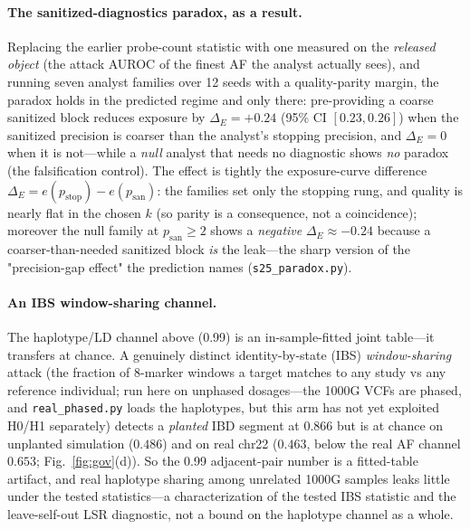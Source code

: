 \documentclass[11pt]{article}
\begin{document}
\paragraph{The sanitized-diagnostics paradox, as a result.} Replacing the
earlier probe-count statistic with one measured on the \emph{released object}
(the attack AUROC of the finest AF the analyst actually sees), and running
seven analyst families over 12 seeds with a quality-parity margin, the paradox
holds in the predicted regime and only there: pre-providing a coarse sanitized
block reduces exposure by $\Delta_E=+0.24$ (95\% CI $[0.23,0.26]$) when the
sanitized precision is coarser than the analyst's stopping precision, and
$\Delta_E=0$ when it is not---while a \emph{null} analyst that needs no
diagnostic shows \emph{no} paradox (the falsification control). The effect is
tightly the exposure-curve difference $\Delta_E=e(p_{\text{stop}})-e(p_{\text{san}})$:
the families set only the stopping rung, and quality is nearly flat in the
chosen $k$ (so parity is a consequence, not a coincidence); moreover the null
family at $p_{\text{san}}\ge2$ shows a \emph{negative} $\Delta_E\approx-0.24$
because a coarser-than-needed sanitized block \emph{is} the leak---the sharp
version of the "precision-gap effect" the prediction names
(\texttt{s25\_paradox.py}).

\paragraph{An IBS window-sharing channel.} The haplotype/LD channel above (0.99) is an
in-sample-fitted joint table---it transfers at chance. A genuinely distinct
identity-by-state (IBS) \emph{window-sharing} attack (the fraction of 8-marker
windows a target matches to any study vs any reference individual; run here on
unphased dosages---the 1000G VCFs are phased, and \texttt{real\_phased.py} loads
the haplotypes, but this arm has not yet exploited H0/H1 separately) detects a
\emph{planted} IBD segment at
$0.866$ but is at chance on unplanted simulation ($0.486$) and on real chr22
($0.463$, below the real AF channel $0.653$; Fig.~\ref{fig:gov}(d)). So the
0.99 adjacent-pair number is a fitted-table artifact, and real haplotype sharing
among unrelated 1000G samples leaks little under the tested statistics---a
characterization of the tested IBS statistic and the leave-self-out LSR
diagnostic, not a bound on the haplotype channel as a whole.
\end{document}
